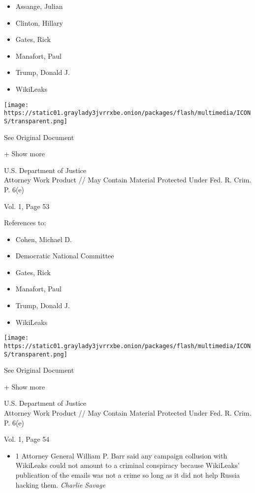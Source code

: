 \begin{itemize}
\tightlist
\item
  Assange, Julian
\item
  Clinton, Hillary
\item
  Gates, Rick
\item
  Manafort, Paul 
\item
  Trump, Donald J.
\item
  WikiLeaks
\end{itemize}

\protect\hyperlink{}{}

\texttt{[image: https://static01.graylady3jvrrxbe.onion/packages/flash/multimedia/ICONS/transparent.png]}

See Original Document

+ Show more

U.S. Department of Justice\\
Attorney Work Product // May Contain Material Protected Under Fed. R.
Crim. P. 6(e)

Vol. 1, Page 53

References to:

\begin{itemize}
\tightlist
\item
  Cohen, Michael D.
\item
  Democratic National Committee
\item
  Gates, Rick
\item
  Manafort, Paul 
\item
  Trump, Donald J.
\item
  WikiLeaks
\end{itemize}

\protect\hyperlink{}{}

\texttt{[image: https://static01.graylady3jvrrxbe.onion/packages/flash/multimedia/ICONS/transparent.png]}

See Original Document

+ Show more

U.S. Department of Justice\\
Attorney Work Product // May Contain Material Protected Under Fed. R.
Crim. P. 6(e)

Vol. 1, Page 54

\begin{itemize}
\tightlist
\item
  1 Attorney General William P. Barr said any campaign collusion with
  WikiLeaks could not amount to a criminal conspiracy because WikiLeaks'
  publication of the emails was not a crime so long as it did not help
  Russia hacking them. \emph{Charlie Savage}
\end{itemize}

